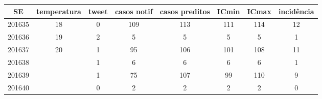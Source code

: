 \begin{tabular}{c|ccccccc}
  \hline
SE & temperatura & tweet & casos notif & casos preditos & ICmin & ICmax & incidência \\ 
  \hline
201635 & 18 & 0 & 109 & 113 & 111 & 114 & 12 \\ 
  201636 & 19 & 2 & 5 & 5 & 5 & 5 & 1 \\ 
  201637 & 20 & 1 & 95 & 106 & 101 & 108 & 11 \\ 
  201638 &  & 1 & 6 & 6 & 6 & 6 & 1 \\ 
  201639 &  & 1 & 75 & 107 & 99 & 110 & 9 \\ 
  201640 &  & 0 & 2 & 2 & 2 & 2 & 0 \\ 
   \hline
\end{tabular}

